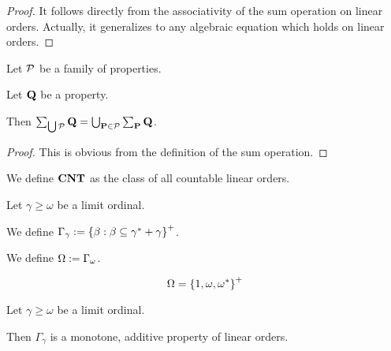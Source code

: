 \begin{proof}
  It follows directly from the associativity of the sum operation on
  linear orders. Actually, it generalizes to any algebraic equation
  which holds on linear orders.
\end{proof}

\begin{lemma}
  Let $\mathcal{P}$ be a family of properties.

  Let $\mathbf{Q}$ be a property.

  Then $\sum_{\bigcup \mathcal{P}}{\mathbf{Q}} = \bigcup_{\mathbf{P} \in \mathcal{P}}{\sum_{\mathbf{P}}{\mathbf{Q}}}$.
\end{lemma}

\begin{proof}
  This is obvious from the definition of the sum operation.
\end{proof}

\begin{definition}
  We define $\mathbf{CNT}$ as the class of all countable linear orders.
\end{definition}


\begin{definition}
  Let $\gamma \ge \omega$ be a limit ordinal.

  We define $\Gamma_{\gamma} := \left\{ {\beta : \beta \subseteq \gamma^\ast + \gamma} \right\}^+$.

  We define $\Omega := \Gamma_{\omega}$.
\end{definition}

\begin{example}
  \[
    \Omega = \left\{ {1, \omega, \omega^\ast} \right\}^+
  \]
\end{example}

\begin{observation}
  Let $\gamma \ge \omega$ be a limit ordinal.

  Then $\Gamma_{\gamma}$ is a monotone, additive property of linear orders.
\end{observation}
